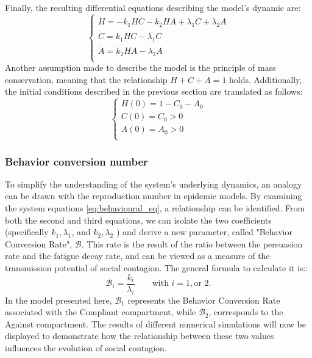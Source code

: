 Finally, the resulting differential equations describing the model's dynamic are:
\begin{equation}
	\label{eq:behavioural_eq}
	\begin{cases}
		\dot{H} = -k_1 H C - k_2 H A + \lambda_1 C + \lambda_2 A \\
		\dot{C} = k_1 H C -  \lambda_1 C \\
		\dot{A} = k_2 H A -  \lambda_2 A\\
	\end{cases}
\end{equation}
Another assumption made to describe the model is the principle of mass conservation, meaning that the relationship $H + C + A = 1$ holds. Additionally, the initial conditions described in the previous section are translated as follows:
\begin{equation}
	\begin{cases}
		H(0) = 1 - C_0 - A_0\\
		C(0) = C_0 > 0\\
		A(0) = A_0 > 0\\
	\end{cases}
\end{equation}

\subsubsection{Behavior conversion number}

To simplify the understanding of the system's underlying dynamics, an analogy can be drawn with the reproduction number in epidemic models. By examining the system equations \ref{eq:behavioural_eq}, a relationship can be identified. From both the second and third equations, we can isolate the two coefficients (specifically $k_1 , \lambda_1 $, and  $k_2 , \lambda_2 $ ) and derive a new parameter, called "Behavior Conversion Rate", $\mathcal{B}$. This rate is the result of the ratio between the persuasion rate and the fatigue decay rate, and can be viewed as a measure of the transmission potential of social contagion. The general formula to calculate it is::
\begin{equation}
	\mathcal{B}_i =\frac{ k_i }{\lambda_i}  \qquad \text{with } i = 1, \text{or } 2.
	\label{eq:behave_rate}
\end{equation}
In the model presented here, $\mathcal{B}_1$ represents the Behavior Conversion Rate associated with the Compliant compartment, while $\mathcal{B}_2$, corresponds to the Against compartment. The results of different numerical simulations will now be displayed to demonstrate how the relationship between these two values influences the evolution of social contagion.

